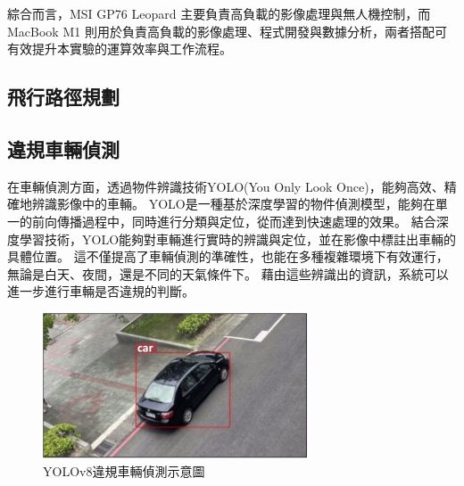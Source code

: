 \documentclass[12pt]{article}       %
\begin{document}
綜合而言，MSI GP76 Leopard 主要負責高負載的影像處理與無人機控制，而 MacBook M1 則用於負責高負載的影像處理、程式開發與數據分析，兩者搭配可有效提升本實驗的運算效率與工作流程。

\subsection{飛行路徑規劃}
\hspace{2em}











\subsection{違規車輛偵測}
\hspace{2em}在車輛偵測方面，透過物件辨識技術YOLO(You Only Look Once)，能夠高效、精確地辨識影像中的車輛。
YOLO是一種基於深度學習的物件偵測模型，能夠在單一的前向傳播過程中，同時進行分類與定位，從而達到快速處理的效果。
結合深度學習技術，YOLO能夠對車輛進行實時的辨識與定位，並在影像中標註出車輛的具體位置。
這不僅提高了車輛偵測的準確性，也能在多種複雜環境下有效運行，無論是白天、夜間，還是不同的天氣條件下。
藉由這些辨識出的資訊，系統可以進一步進行車輛是否違規的判斷。
\begin{figure}[H]
    \centering
    \includegraphics[width=0.7\textwidth]{yolov7car.jpg}     %
    \caption{YOLOv8違規車輛偵測示意圖}    %
    \label{fig:yolov7car}    %
\end{figure}
\end{document}

